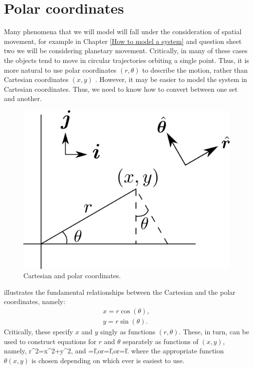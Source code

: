 \section{Polar coordinates}
Many phenomena that we will model will fall under the consideration of spatial movement, for example in Chapter \ref{How to model a system} and question sheet two we will be considering planetary movement. Critically, in many of these cases the objects tend to move in circular trajectories orbiting a single point. Thus, it is more natural to use polar coordinates $(r,\theta)$ to describe the motion, rather than Cartesian coordinates $(x,y)$ . However, it may be easier to model the system in Cartesian coordinates. Thus, we need to know how to convert between one set and another.
\begin{figure}[h!!!tb]
\centering
\includegraphics[width=\ttp]{../Pictures/Polars.png}
\caption{\label{Polars} Cartesian and polar coordinates.}
\end{figure} 

 illustrates the fundamental relationships between the Cartesian and the polar coordinates, namely:
\begin{align}
x=r\cos(\theta),\\
y=r\sin(\theta).
\end{align}
Critically, these specify $x$ and $y$ singly as functions $(r,\theta)$. These, in turn, can be used to construct equations for $r$ and $\theta$ separately as functions of $(x,y)$, namely,
\bb
r^2=x^2+y^2,
\ee
and
\bb
\theta=\arctan\l{}\r,\quad \textrm{or}\quad\theta=\arccos\l{}\r,\quad \textrm{or}\quad\theta=\arcsin\l{}\r.\label{theta_eqns}
\ee
where the appropriate function $\theta(x,y)$ is chosen depending on which ever is easiest to use.


